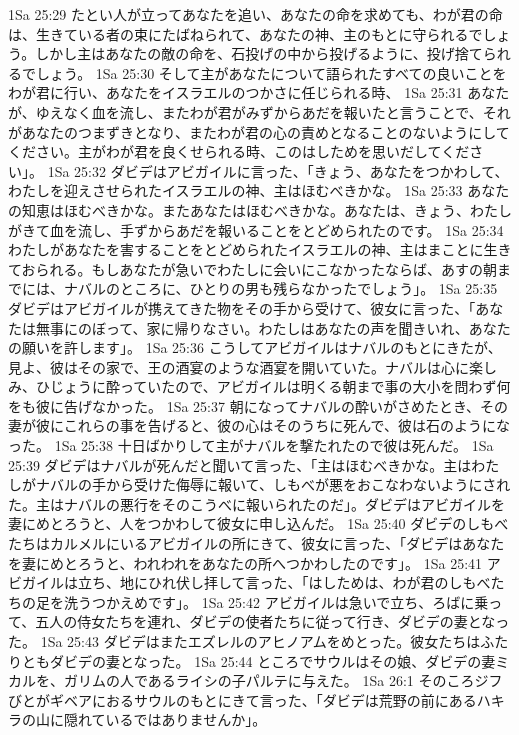 1Sa 25:29  たとい人が立ってあなたを追い、あなたの命を求めても、わが君の命は、生きている者の束にたばねられて、あなたの神、主のもとに守られるでしょう。しかし主はあなたの敵の命を、石投げの中から投げるように、投げ捨てられるでしょう。
1Sa 25:30  そして主があなたについて語られたすべての良いことをわが君に行い、あなたをイスラエルのつかさに任じられる時、
1Sa 25:31  あなたが、ゆえなく血を流し、またわが君がみずからあだを報いたと言うことで、それがあなたのつまずきとなり、またわが君の心の責めとなることのないようにしてください。主がわが君を良くせられる時、このはしためを思いだしてください」。
1Sa 25:32  ダビデはアビガイルに言った、「きょう、あなたをつかわして、わたしを迎えさせられたイスラエルの神、主はほむべきかな。
1Sa 25:33  あなたの知恵はほむべきかな。またあなたはほむべきかな。あなたは、きょう、わたしがきて血を流し、手ずからあだを報いることをとどめられたのです。
1Sa 25:34  わたしがあなたを害することをとどめられたイスラエルの神、主はまことに生きておられる。もしあなたが急いでわたしに会いにこなかったならば、あすの朝までには、ナバルのところに、ひとりの男も残らなかったでしょう」。
1Sa 25:35  ダビデはアビガイルが携えてきた物をその手から受けて、彼女に言った、「あなたは無事にのぼって、家に帰りなさい。わたしはあなたの声を聞きいれ、あなたの願いを許します」。
1Sa 25:36  こうしてアビガイルはナバルのもとにきたが、見よ、彼はその家で、王の酒宴のような酒宴を開いていた。ナバルは心に楽しみ、ひじょうに酔っていたので、アビガイルは明くる朝まで事の大小を問わず何をも彼に告げなかった。
1Sa 25:37  朝になってナバルの酔いがさめたとき、その妻が彼にこれらの事を告げると、彼の心はそのうちに死んで、彼は石のようになった。
1Sa 25:38  十日ばかりして主がナバルを撃たれたので彼は死んだ。
1Sa 25:39  ダビデはナバルが死んだと聞いて言った、「主はほむべきかな。主はわたしがナバルの手から受けた侮辱に報いて、しもべが悪をおこなわないようにされた。主はナバルの悪行をそのこうべに報いられたのだ」。ダビデはアビガイルを妻にめとろうと、人をつかわして彼女に申し込んだ。
1Sa 25:40  ダビデのしもべたちはカルメルにいるアビガイルの所にきて、彼女に言った、「ダビデはあなたを妻にめとろうと、われわれをあなたの所へつかわしたのです」。
1Sa 25:41  アビガイルは立ち、地にひれ伏し拝して言った、「はしためは、わが君のしもべたちの足を洗うつかえめです」。
1Sa 25:42  アビガイルは急いで立ち、ろばに乗って、五人の侍女たちを連れ、ダビデの使者たちに従って行き、ダビデの妻となった。
1Sa 25:43  ダビデはまたエズレルのアヒノアムをめとった。彼女たちはふたりともダビデの妻となった。
1Sa 25:44  ところでサウルはその娘、ダビデの妻ミカルを、ガリムの人であるライシの子パルテに与えた。
1Sa 26:1  そのころジフびとがギベアにおるサウルのもとにきて言った、「ダビデは荒野の前にあるハキラの山に隠れているではありませんか」。
